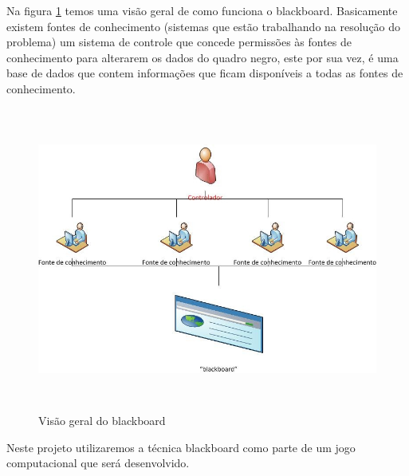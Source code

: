 Na figura \ref{blackboard} temos uma visão geral de como funciona o blackboard. Basicamente existem fontes de conhecimento (sistemas que estão trabalhando na resolução do problema) um sistema de controle que concede permissões às fontes de conhecimento para alterarem os dados do quadro negro, este por sua vez, é uma base de dados que contem informações que ficam disponíveis a todas as fontes de conhecimento.

\begin{figure}
\centering
\includegraphics [height=10cm]{figuras/visao_geral_blackboard.jpg}
\caption{Visão geral do blackboard}
\label{blackboard}
\end{figure}
	
Neste projeto utilizaremos a técnica blackboard como parte de um jogo computacional que será desenvolvido.


